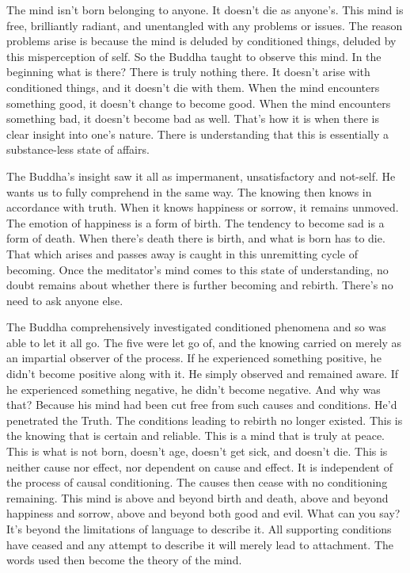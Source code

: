 The mind isn't born belonging to anyone. It doesn't die as anyone's. This mind is free, brilliantly radiant, and unentangled with any problems or issues. The reason problems arise is because the mind is deluded by conditioned things, deluded by this misperception of self. So the Buddha taught to observe this mind. In the beginning what is there? There is truly nothing there. It doesn't arise with conditioned things, and it doesn't die with them. When the mind encounters something good, it doesn't change to become good. When the mind encounters something bad, it doesn't become bad as well. That's how it is when there is clear insight into one's nature. There is understanding that this is essentially a substance-less state of affairs.

The Buddha's insight saw it all as impermanent, unsatisfactory and not-self. He wants us to fully comprehend in the same way. The knowing then knows in accordance with truth. When it knows happiness or sorrow, it remains unmoved. The emotion of happiness is a form of birth. The tendency to become sad is a form of death. When there's death there is birth, and what is born has to die. That which arises and passes away is caught in this unremitting cycle of becoming. Once the meditator's mind comes to this state of understanding, no doubt remains about whether there is further becoming and rebirth. There's no need to ask anyone else.

The Buddha comprehensively investigated conditioned phenomena and so was able to let it all go. The five  were let go of, and the knowing carried on merely as an impartial observer of the process. If he experienced something positive, he didn't become positive along with it. He simply observed and remained aware. If he experienced something negative, he didn't become negative. And why was that? Because his mind had been cut free from such causes and conditions. He'd penetrated the Truth. The conditions leading to rebirth no longer existed. This is the knowing that is certain and reliable. This is a mind that is truly at peace. This is what is not born, doesn't age, doesn't get sick, and doesn't die. This is neither cause nor effect, nor dependent on cause and effect. It is independent of the process of causal conditioning. The causes then cease with no conditioning remaining. This mind is above and beyond birth and death, above and beyond happiness and sorrow, above and beyond both good and evil. What can you say? It's beyond the limitations of language to describe it. All supporting conditions have ceased and any attempt to describe it will merely lead to attachment. The words used then become the theory of the mind.

